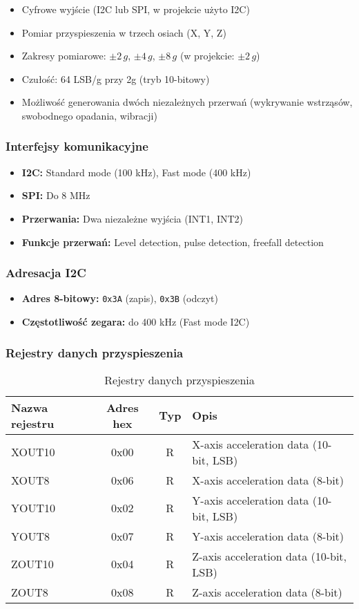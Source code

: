 \documentclass[letterpaper,11pt]{report}
\begin{document}
\begin{itemize}
    \item Cyfrowe wyjście (I2C lub SPI, w projekcie użyto I2C)
    \item Pomiar przyspieszenia w trzech osiach (X, Y, Z)
    \item Zakresy pomiarowe: \(\pm2\,g\), \(\pm4\,g\), \(\pm8\,g\) (w projekcie: \(\pm2\,g\))
    \item Czułość: 64 LSB/g przy 2g (tryb 10-bitowy)
    \item Możliwość generowania dwóch niezależnych przerwań (wykrywanie wstrząsów, swobodnego opadania, wibracji)
\end{itemize}

\subsubsection{Interfejsy komunikacyjne}
\begin{itemize}
    \item \textbf{I2C:} Standard mode (100 kHz), Fast mode (400 kHz)
    \item \textbf{SPI:} Do 8 MHz
    \item \textbf{Przerwania:} Dwa niezależne wyjścia (INT1, INT2)
    \item \textbf{Funkcje przerwań:} Level detection, pulse detection, freefall detection
\end{itemize}

\subsubsection{Adresacja I2C}
\begin{itemize}
    \item \textbf{Adres 8-bitowy:} \texttt{0x3A} (zapis), \texttt{0x3B} (odczyt)
    \item \textbf{Częstotliwość zegara:} do 400 kHz (Fast mode I2C)
\end{itemize}

\subsubsection{Rejestry danych przyspieszenia}

\begin{table}[H]
\centering
\begin{tabular}{|l|c|c|l|}
\hline
\textbf{Nazwa rejestru} & \textbf{Adres hex} & \textbf{Typ} & \textbf{Opis} \\
\hline
XOUT10 & 0x00 & R & X-axis acceleration data (10-bit, LSB) \\
XOUT8 & 0x06 & R & X-axis acceleration data (8-bit) \\
YOUT10 & 0x02 & R & Y-axis acceleration data (10-bit, LSB) \\
YOUT8 & 0x07 & R & Y-axis acceleration data (8-bit) \\
ZOUT10 & 0x04 & R & Z-axis acceleration data (10-bit, LSB) \\
ZOUT8 & 0x08 & R & Z-axis acceleration data (8-bit) \\
\hline
\end{tabular}
\caption{Rejestry danych przyspieszenia}
\end{table}
\end{document}
